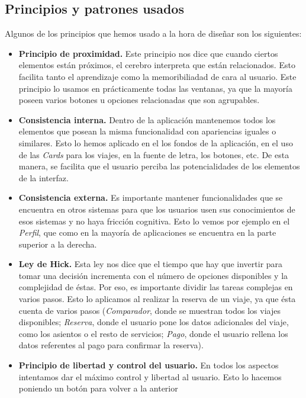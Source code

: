 \subsection{Principios y patrones usados}

Algunos de los principios que hemos usado a la hora de diseñar son los siguientes:

\begin{itemize}

      \item \textbf{Principio de proximidad.} Este principio nos dice que cuando ciertos elementos están próximos, el cerebro interpreta
            que están relacionados. Esto facilita tanto el aprendizaje como la memoribiliadad de cara al usuario. Este principio lo usamos en prácticamente
            todas las ventanas, ya que la mayoría poseen varios botones u opciones relacionadas que son agrupables.
      \item \textbf{Consistencia interna.} Dentro de la aplicación mantenemos todos los elementos que posean la misma funcionalidad con apariencias iguales
            o similares. Esto lo hemos aplicado en el los fondos de la aplicación, en el uso de las \textit{Cards} para los viajes, en la fuente de letra, los
            botones, etc. De esta manera, se facilita que el usuario perciba las potencialidades de los elementos de la interfaz.
      \item \textbf{Consistencia externa.} Es importante mantener funcionalidades que se encuentra en otros sistemas para que los usuarios usen sus conocimientos
            de esos sistemas y no haya fricción cognitiva. Esto lo vemos por ejemplo en el \textit{Perfil}, que como en la mayoría de aplicaciones se encuentra en la parte
            superior a la derecha.
      \item \textbf{Ley de Hick.} Esta ley nos dice que el tiempo que hay que invertir para tomar una decisión incrementa con el número de opciones disponibles y la complejidad
            de éstas. Por eso, es importante dividir las tareas complejas en varios pasos. Esto lo aplicamos al realizar la reserva de un viaje, ya que ésta cuenta de varios
            pasos (\textit{Comparador}, donde se muestran todos los viajes disponibles; \textit{Reserva}, donde el usuario pone los datos adicionales del viaje, como los asientos
            o el resto de servicios; \textit{Pago}, donde el usuario rellena los datos referentes al pago para confirmar la reserva).
      \item \textbf{Principio de libertad y control del usuario.} En todos los aspectos intentamos dar el máximo control y libertad al usuario. Esto lo hacemos poniendo un botón para volver a la anterior

\end{itemize}
